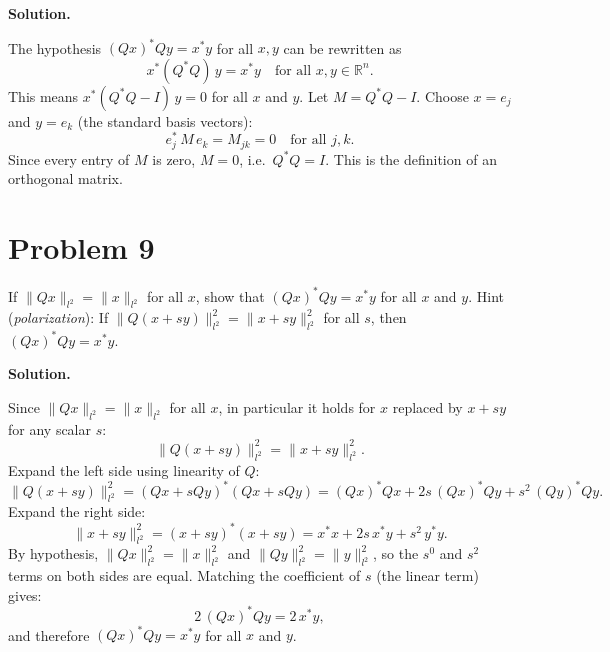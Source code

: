 \documentclass[letterpaper, 11pt]{article}
\newcommand{\R}{\mathbb{R}}   %
\newcommand{\1}{\mathds{1}}	%
\theoremstyle{definition}
\begin{document}
\medskip

\textbf{Solution.}

The hypothesis $(Qx)^*Qy = x^*y$ for all $x, y$ can be rewritten as
\[
x^*(Q^*Q)\,y = x^*y \quad \text{for all } x, y \in \R^n.
\]
This means $x^*(Q^*Q - I)\,y = 0$ for all $x$ and $y$. Let $M = Q^*Q - I$. Choose $x = e_j$ and $y = e_k$ (the standard basis vectors):
\[
e_j^*\, M\, e_k = M_{jk} = 0 \quad \text{for all } j, k.
\]
Since every entry of $M$ is zero, $M = 0$, i.e.\ $Q^*Q = I$. This is the definition of an orthogonal matrix.
\section*{Problem 9}

If $\|Qx\|_{l^2} = \|x\|_{l^2}$ for all $x$, show that $(Qx)^*Qy = x^*y$ for all $x$ and $y$. Hint (\textit{polarization}): If $\|Q(x+sy)\|_{l^2}^2 = \|x+sy\|_{l^2}^2$ for all $s$, then $(Qx)^*Qy = x^*y$.

\medskip

\textbf{Solution.}

Since $\|Qx\|_{l^2} = \|x\|_{l^2}$ for all $x$, in particular it holds for $x$ replaced by $x + sy$ for any scalar $s$:
\[
\|Q(x+sy)\|_{l^2}^2 = \|x + sy\|_{l^2}^2.
\]
Expand the left side using linearity of $Q$:
\[
\|Q(x+sy)\|_{l^2}^2 = (Qx + sQy)^*(Qx + sQy) = (Qx)^*Qx + 2s\,(Qx)^*Qy + s^2\,(Qy)^*Qy.
\]
Expand the right side:
\[
\|x+sy\|_{l^2}^2 = (x+sy)^*(x+sy) = x^*x + 2s\,x^*y + s^2\,y^*y.
\]
By hypothesis, $\|Qx\|_{l^2}^2 = \|x\|_{l^2}^2$ and $\|Qy\|_{l^2}^2 = \|y\|_{l^2}^2$, so the $s^0$ and $s^2$ terms on both sides are equal. Matching the coefficient of $s$ (the linear term) gives:
\[
2\,(Qx)^*Qy = 2\,x^*y,
\]
and therefore $(Qx)^*Qy = x^*y$ for all $x$ and $y$.
\end{document}
